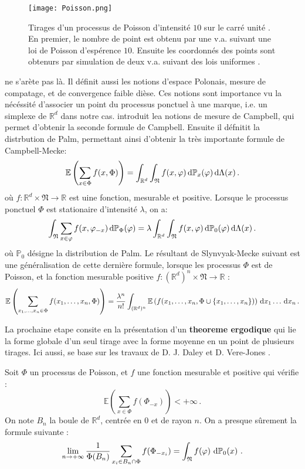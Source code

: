 \begin{figure}[H]
    \centering
    \texttt{[image: Poisson.png]}\
    \caption{Tirages d’un processus de Poisson d’intensité $10$ sur le carré unité \parencite[p.137]{balasoiu2020halthesis}. En premier, le nombre de point est obtenu par une v.a. suivant une loi de Poisson d'espérence $10$. Ensuite les coordonnés des points sont obtenurs par simulation de deux v.a. suivant des lois uniformes \parencite{keeler2018simu}.}
    \label{fig:poisson}
\end{figure}

\citeauthor{balasoiu2020halthesis} ne s'arète pas là. Il définit aussi les notions d'espace Polonais, mesure de compatage, et de convergence faible dièse. Ces notions sont importance vu la nécéssité d'associer un point du processus ponctuel à une marque, i.e. un simplexe de $\mathbb{R}^d$ dans notre cas. \citeauthor{balasoiu2020halthesis} introduit lea notions de mesure de Campbell, qui permet d'obtenir la seconde formule de Campbell. Ensuite il défnitit la distrbution de Palm, permettant ainsi d'obtenir la très importante formule de Campbell-Mecke:
\[
\mathbb{E} \left( \sum_{x \in \Phi} f(x,\Phi) \right) = \int_{\mathbb{R}^d} \int_{\mathfrak{N}} f(x,\varphi) \diff
\mathbb{P}_x(\varphi) \diff \Lambda(x) \,.
\]
où $f:\mathbb{R}^d \times \mathfrak{N} \rightarrow \mathbb{R}$ est uine fonction, mesurable et positive. Lorsque le processus ponctuel $\Phi$ est stationaire d'intensité $\lambda$, on a:
\[
 \int_{\mathfrak{N}} \sum_{x \in \varphi} f(x,\varphi_{ - x}) \diff\mathbb{P}_\Phi(\varphi) = \lambda \int_{\mathbb{R}^d} \int_{\mathfrak{N}} f(x,\varphi) \diff
\mathbb{P}_0(\varphi) \diff \Lambda(x) \,.
\]
où $\mathbb{P}_0$ désigne la distribution de Palm. Le résultant de Slynvyak-Mecke suivant est une généralisation de cette dernière formule, lorsque les processus $\Phi$ est de Poisson, et la fonction mesurable positive $f:(\mathbb{R}^d)^n \times \mathfrak{N} \rightarrow \mathbb{R}$ :
\[
\mathbb{E} \left( \sum_{x_1,\ldots,x_n \in \Phi} f(x_1,\ldots,x_n,\Phi) \right) = \frac{\lambda^n}{n!} \int_{(\mathbb{R}^d)^n} \mathbb{E} \left(f(x_1,\ldots,x_n,\Phi \cup \{ x_1,\ldots,x_n \}) \right) \diff x_1 \ldots \diff x_n \,.
\]

La prochaine etape consite en la présentation d'un \textbf{theoreme ergodique} qui lie la forme globale d’un seul tirage avec la forme moyenne en un point de plusieurs tirages. Ici aussi, \citeauthor{balasoiu2020halthesis} se base sur les travaux de D. J. Daley et D. Vere-Jones \parencite{daley2008introduction}.
\begin{theorem} \label{th:slmk}
    Soit $\Phi$ un processus de Poisson, et $f$ une fonction mesurable et positive qui vérifie :
    $$
    \mathbb{E}\left( \sum_{x\in \Phi} f(\Phi_{-x}) \right) < +\infty \,.
    $$
    On note $B_n$ la boule de $\mathbb{R}^d$, centrée en $0$ et de rayon $n$. On a presque sûrement la formule
    suivante :
    $$
    \lim_{n\rightarrow +\infty} \frac{1}{\Phi(B_n)} \sum_{x_i \in B_n \cap \Phi} f(\Phi_{-x_i}) = \int_{\mathfrak{N}} f(\varphi) \diff{\mathbb{P}_0(x)}  \,. 
    $$
\end{theorem}

